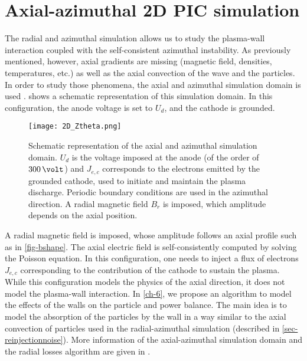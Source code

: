 
\section{Axial-azimuthal \acs{2D} \acs{PIC} simulation}
  \label{sec-axial-azimuthal}
  
  The radial and azimuthal simulation allows us to study the plasma-wall interaction coupled with the self-consistent azimuthal instability.
  As previously mentioned, however, axial gradients are missing (magnetic field, densities, temperatures, etc.) as well as the axial convection of the wave and the particles.
  In order to study those phenomena, the axial and azimuthal simulation domain is used \citep{adam2004,coche2014,lafleur2018,boeuf2018}.
   shows a schematic representation of this simulation domain.
  In this configuration, the anode voltage is set to $U_d$, and the cathode is grounded.
  
  
  
  \begin{figure}[hbt]
    \centering
    \texttt{[image: 2D\_Ztheta.png]}
    \caption{Schematic representation of the axial and azimuthal simulation domain. $U_d$ is the voltage imposed at the anode (of the order of $300\,\volt$) and $J_{e,c}$ corresponds to the electrons emitted by the grounded cathode, used to initiate and maintain the plasma discharge. Periodic boundary conditions are used in the azimuthal direction. A radial magnetic field $B_r$ is imposed, which amplitude depends on the axial position. }
    \label{fig-2Dz}
  \end{figure}
  A radial magnetic field is imposed, whose amplitude follows an axial profile such as in \cref{fig-bshape}.
  The axial electric field is self-consistently computed by solving the Poisson equation.
  In this configuration, one needs to inject a flux of electrons $J_{e,c}$ corresponding to the contribution of the cathode to sustain the plasma.
  While this configuration models the physics of the axial direction, it does not model the plasma-wall interaction.
  In \cref{ch-6}, we propose an algorithm to model the effects of the walls on the particle and power balance.
  The main idea is to model the absorption  of the particles by the wall in a way similar to the axial convection of particles used in the radial-azimuthal simulation (described in \cref{sec-reinjectionnoise}).
  More information of the axial-azimuthal simulation domain and the radial losses algorithm are given in .
  
  